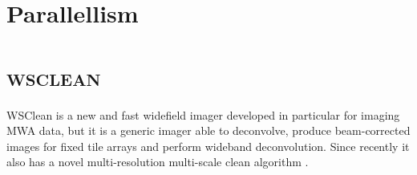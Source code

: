 \documentclass[9pt,conference,a4paper]{IEEEtran}
\begin{document}
\section{Parallellism}

\section{\textsc{wsclean}}
WSClean is a new and fast widefield imager developed in particular for imaging MWA data, but it is a generic imager able to deconvolve, produce beam-corrected images for fixed tile arrays and perform wideband deconvolution. Since recently it also has a novel multi-resolution multi-scale clean algorithm \cite{offringa-wsclean-2014}.

\DeclareRobustCommand{\TUSSEN}[3]{#3}



\end{document}
